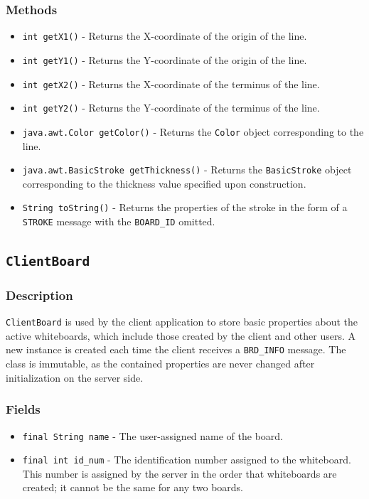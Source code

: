 \subsubsection{Methods}
\begin{itemize}
\item \texttt{int getX1()} - Returns the X-coordinate of the origin of the line.
\item \texttt{int getY1()} - Returns the Y-coordinate of the origin of the line.
\item \texttt{int getX2()} - Returns the X-coordinate of the terminus of the line.
\item \texttt{int getY2()} - Returns the Y-coordinate of the terminus of the line.
\item \texttt{java.awt.Color getColor()} - Returns the \texttt{Color} object corresponding to the line.
\item \texttt{java.awt.BasicStroke getThickness()} - Returns the \texttt{BasicStroke} object corresponding to the thickness value specified upon construction.
\item \texttt{String toString()} - Returns the properties of the stroke in the form of a \texttt{STROKE} message with the \texttt{BOARD\_ID} omitted.
\end{itemize}



\subsection{\texttt{ClientBoard}}

\subsubsection{Description}
\texttt{ClientBoard} is used by the client application to store basic properties about the active whiteboards, which include those created by the client and other users. A new instance is created each time the client receives a \texttt{BRD\_INFO} message. The class is immutable, as the contained properties are never changed after initialization on the server side.

\subsubsection{Fields}
\begin{itemize}
\item \texttt{final String name} - The user-assigned name of the board.
\item \texttt{final int id\_num} - The identification number assigned to the whiteboard. This number is assigned by the server in the order that whiteboards are created; it cannot be the same for any two boards.
\end{itemize}

